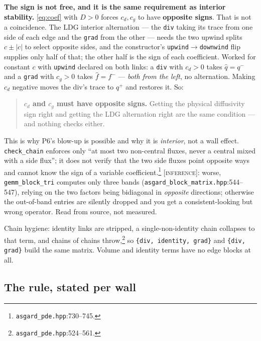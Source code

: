 \documentclass[10pt]{article}
\newcommand{\code}[1]{\texttt{#1}}
\newcommand{\hq}{\widehat{q}}
\newcommand{\hf}{\widehat{f}}
\newcommand{\INF}{\textcolor{red!60!black}{\textsc{[inference]}}}
\newcommand{\fl}[2]{\texttt{#1}:#2}
\begin{document}
\textbf{The sign is not free, and it is the same requirement as interior
stability.} \eqref{eq:coef} with $D>0$ forces $c_d,c_g$ to have \textbf{opposite
signs}. That is not a coincidence. The LDG interior alternation --- the
\code{div} taking its trace from one side of each edge and the \code{grad} from
the other --- needs the two upwind splits $c\pm|c|$ to select opposite sides, and
the constructor's \code{upwind}$\to$\code{downwind} flip supplies only half of
that; the other half is the sign of each coefficient. Worked for constant $c$
with \code{upwind} declared on both links: a \code{div} with $c_d>0$ takes
$\hq=q^-$ and a \code{grad} with $c_g>0$ takes $\hf=f^-$ --- \emph{both from the
left}, no alternation. Making $c_d$ negative moves the div's trace to $q^+$ and
restores it. So:
\begin{quote}
\textbf{$c_d$ and $c_g$ must have opposite signs.} Getting the physical
diffusivity sign right and getting the LDG alternation right are the same
condition --- and nothing checks either.
\end{quote}
This is why P6's blow-up is possible and why it is \emph{interior}, not a wall
effect. \code{check\_chain} enforces only ``at most two non-central fluxes, never
a central mixed with a side flux''; it does not verify that the two side fluxes
point opposite ways and cannot know the sign of a variable
coefficient.\footnote{\fl{asgard\_pde.hpp}{730--745}.} \INF{}: worse,
\code{gemm\_block\_tri} computes only three bands
(\fl{asgard\_block\_matrix.hpp}{544--547}), relying on the two factors being
bidiagonal in \emph{opposite} directions; otherwise the out-of-band entries are
silently dropped and you get a consistent-looking but wrong operator. Read from
source, not measured.

Chain hygiene: identity links are stripped, a single-non-identity chain collapses
to that term, and chains of chains throw,\footnote{\fl{asgard\_pde.hpp}{524--561}.}
so \code{\{div, identity, grad\}} and \code{\{div, grad\}} build the same matrix.
Volume and identity terms have no edge blocks at all.

\subsection{The rule, stated per wall}
\label{sec:four}
\end{document}
